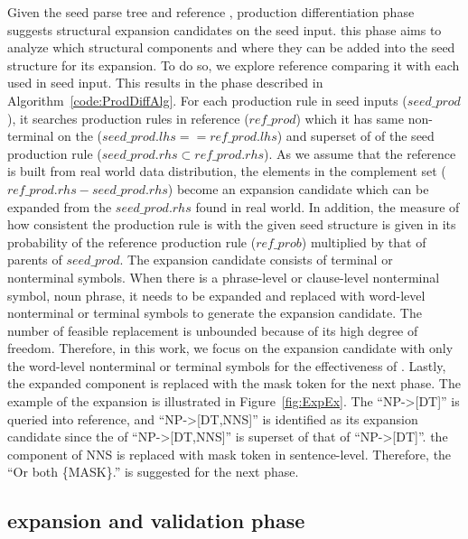Given the seed parse tree and reference \pcfg, production
differentiation phase suggests structural expansion candidates on the
seed input. this phase aims to analyze which structural components and
where they can be added into the seed structure for its expansion. To
do so, we explore reference \prodrs comparing it with each \prodr used
in seed input. This results in the phase described in
Algorithm~\ref{code:ProdDiffAlg}. For each production rule in seed
inputs ($seed\_prod$), it searches production rules in reference
($ref\_prod$) which it has same non-terminal on the \lhs
($seed\_prod.lhs==ref\_prod.lhs$) and superset of \rhs of the seed
production rule ($seed\_prod.rhs \subset ref\_prod.rhs$).  As we
assume that the reference \cfg is built from real world data
distribution, the elements in the complement set ($ref\_prod.rhs -
seed\_prod.rhs$) become an expansion candidate which can be expanded
from the $seed\_prod.rhs$ found in real world. In addition, the
measure of how consistent the production rule is with the given seed
structure is given in its probability of the reference production rule
($ref\_prob$) multiplied by that of parents of $seed\_prod$. The
expansion candidate consists of terminal or nonterminal symbols. When
there is a phrase-level or clause-level nonterminal symbol, \eg noun
phrase, it needs to be expanded and replaced with word-level
nonterminal or terminal symbols to generate the expansion
candidate. The number of feasible replacement is unbounded because of
its high degree of freedom. Therefore, in this work, we focus on the
expansion candidate with only the word-level nonterminal or terminal
symbols for the effectiveness of \Model. Lastly, the expanded
component is replaced with the mask token for the next phase. The
example of the expansion is illustrated in
Figure~\ref{fig:ExpEx}. The ``NP->[DT]'' is queried into
reference, and ``NP->[DT,NNS]'' is identified as its expansion
candidate since the \rhs of ``NP->[DT,NNS]'' is superset of that of
``NP->[DT]''. the component of NNS is replaced with mask token in
sentence-level. Therefore, the ``Or both \{MASK\}.'' is suggested for
the next phase.

\subsection{\Sent expansion and validation phase}

